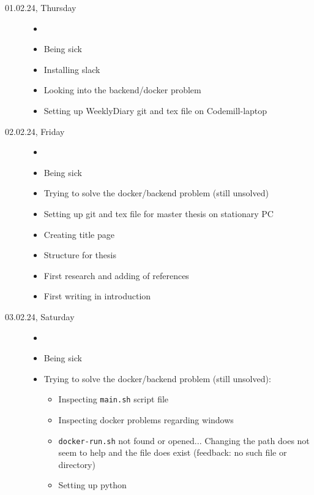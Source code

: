 \documentclass[a4, 11pt]{scrartcl}
\begin{document}
\begin{description}





\item[01.02.24, Thursday]
\begin{itemize}
	\item[]
	\item Being sick \frownie{}
	\item Installing slack
	\item Looking into the backend/docker problem %
	\item Setting up WeeklyDiary git and tex file on Codemill-laptop
\end{itemize}






\item[02.02.24, Friday]
\begin{itemize}
	\item[]
	\item Being sick \frownie{}
	\item Trying to solve the docker/backend problem (still unsolved)
	\item Setting up git and tex file for master thesis on stationary PC
	\item Creating title page
	\item Structure for thesis
	\item First research and adding of references
	\item First writing in introduction
\end{itemize}




\item[03.02.24, Saturday]
\begin{itemize}
	\item[]
	\item Being sick \frownie{}
	\item Trying to solve the docker/backend problem (still unsolved):
	\begin{itemize}
		\item Inspecting \texttt{main.sh} script file
		\item Inspecting docker problems regarding windows
		\item \texttt{docker-run.sh} not found or opened... Changing the path does not seem to help and the file does exist (feedback: no such file or directory)
		\item Setting up python
	\end{itemize}
\end{itemize}


	\end{description}
\end{document}
